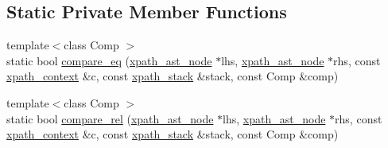 \subsection*{Static Private Member Functions}
\begin{DoxyCompactItemize}
\item 
{\footnotesize template$<$class Comp $>$ }\\static bool \hyperlink{classxpath__ast__node_a98dd7f6e67fe2c56c63056eed835d6a4}{compare\-\_\-eq} (\hyperlink{classxpath__ast__node}{xpath\-\_\-ast\-\_\-node} $\ast$lhs, \hyperlink{classxpath__ast__node}{xpath\-\_\-ast\-\_\-node} $\ast$rhs, const \hyperlink{structxpath__context}{xpath\-\_\-context} \&c, const \hyperlink{structxpath__stack}{xpath\-\_\-stack} \&stack, const Comp \&comp)
\item 
{\footnotesize template$<$class Comp $>$ }\\static bool \hyperlink{classxpath__ast__node_abb6e4c529276eaf882233dbb6e04e111}{compare\-\_\-rel} (\hyperlink{classxpath__ast__node}{xpath\-\_\-ast\-\_\-node} $\ast$lhs, \hyperlink{classxpath__ast__node}{xpath\-\_\-ast\-\_\-node} $\ast$rhs, const \hyperlink{structxpath__context}{xpath\-\_\-context} \&c, const \hyperlink{structxpath__stack}{xpath\-\_\-stack} \&stack, const Comp \&comp)
\end{DoxyCompactItemize}
